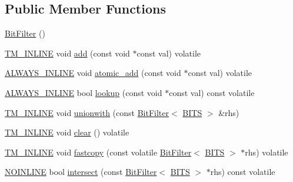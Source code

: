 \subsection*{Public Member Functions}
\begin{DoxyCompactItemize}
\item 
\hyperlink{classstm_1_1BitFilter_a5156e67f92e0b419ce0caa47a949f8dc}{Bit\-Filter} ()
\item 
\hyperlink{platform_8hpp_abdc8d70d196a73a2a119efdbe674ecf8}{T\-M\-\_\-\-I\-N\-L\-I\-N\-E} void \hyperlink{classstm_1_1BitFilter_aedccb5a7fdc84cd6f71d15a5ba03875e}{add} (const void $\ast$const val) volatile
\item 
\hyperlink{platform_8hpp_aa1dec568e79152c892dcf63f445cbd7a}{A\-L\-W\-A\-Y\-S\-\_\-\-I\-N\-L\-I\-N\-E} void \hyperlink{classstm_1_1BitFilter_a2b2df3ea67e7b1cbe0cedd4801c004b1}{atomic\-\_\-add} (const void $\ast$const val) volatile
\item 
\hyperlink{platform_8hpp_aa1dec568e79152c892dcf63f445cbd7a}{A\-L\-W\-A\-Y\-S\-\_\-\-I\-N\-L\-I\-N\-E} bool \hyperlink{classstm_1_1BitFilter_a7f3aa56e438e3bec7542f5f4f0797074}{lookup} (const void $\ast$const val) const volatile
\item 
\hyperlink{platform_8hpp_abdc8d70d196a73a2a119efdbe674ecf8}{T\-M\-\_\-\-I\-N\-L\-I\-N\-E} void \hyperlink{classstm_1_1BitFilter_a8f3ad387b791b61b5baf499330f8a2b3}{unionwith} (const \hyperlink{classstm_1_1BitFilter}{Bit\-Filter}$<$ \hyperlink{alg__radix__smp_8c_a3e027e31373b901c1ac291dfad9f89a3}{B\-I\-T\-S} $>$ \&rhs)
\item 
\hyperlink{platform_8hpp_abdc8d70d196a73a2a119efdbe674ecf8}{T\-M\-\_\-\-I\-N\-L\-I\-N\-E} void \hyperlink{classstm_1_1BitFilter_aaf6a6d0e31cf9daa46c379226a4d2d34}{clear} () volatile
\item 
\hyperlink{platform_8hpp_abdc8d70d196a73a2a119efdbe674ecf8}{T\-M\-\_\-\-I\-N\-L\-I\-N\-E} void \hyperlink{classstm_1_1BitFilter_a00ad85695af6d5a8d20b671fc7f2638e}{fastcopy} (const volatile \hyperlink{classstm_1_1BitFilter}{Bit\-Filter}$<$ \hyperlink{alg__radix__smp_8c_a3e027e31373b901c1ac291dfad9f89a3}{B\-I\-T\-S} $>$ $\ast$rhs) volatile
\item 
\hyperlink{platform_8hpp_a1b173d22e57d9395897acbd8de62d505}{N\-O\-I\-N\-L\-I\-N\-E} bool \hyperlink{classstm_1_1BitFilter_ab3d4f3cf34e6223c54c021eaab24704d}{intersect} (const \hyperlink{classstm_1_1BitFilter}{Bit\-Filter}$<$ \hyperlink{alg__radix__smp_8c_a3e027e31373b901c1ac291dfad9f89a3}{B\-I\-T\-S} $>$ $\ast$rhs) const volatile
\end{DoxyCompactItemize}
